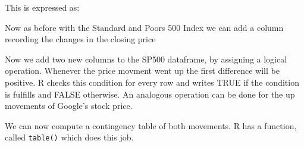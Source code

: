 \documentclass[
]{book}
\newenvironment{Shaded}{\begin{snugshade}}{\end{snugshade}}
\newcommand{\ConstantTok}[1]{\textcolor[rgb]{0.00,0.00,0.00}{#1}}
\newcommand{\DecValTok}[1]{\textcolor[rgb]{0.00,0.00,0.81}{#1}}
\newcommand{\FunctionTok}[1]{\textcolor[rgb]{0.00,0.00,0.00}{#1}}
\newcommand{\NormalTok}[1]{#1}
\newcommand{\OtherTok}[1]{\textcolor[rgb]{0.56,0.35,0.01}{#1}}
\newcommand{\SpecialCharTok}[1]{\textcolor[rgb]{0.00,0.00,0.00}{#1}}
\newcommand{\StringTok}[1]{\textcolor[rgb]{0.31,0.60,0.02}{#1}}
\begin{document}
This is expressed as:

\begin{Shaded}
\end{Shaded}

Now as before with the Standard and Poors 500 Index we can add a column recording the changes
in the closing price

\begin{Shaded}
\end{Shaded}

Now we add two new columns to the SP500 dataframe, by assigning a logical operation. Whenever
the price movment went up the first difference will be positive. R checks this condition for
every row and writes TRUE if the condition is fulfills and FALSE otherwise. An analogous
operation can be done for the up movements of Google's stock price.

\begin{Shaded}
\end{Shaded}

We can now compute a contingency table of both movements. R has a function, called \texttt{table()}
which does this job.

\begin{Shaded}
\end{Shaded}
\end{document}
